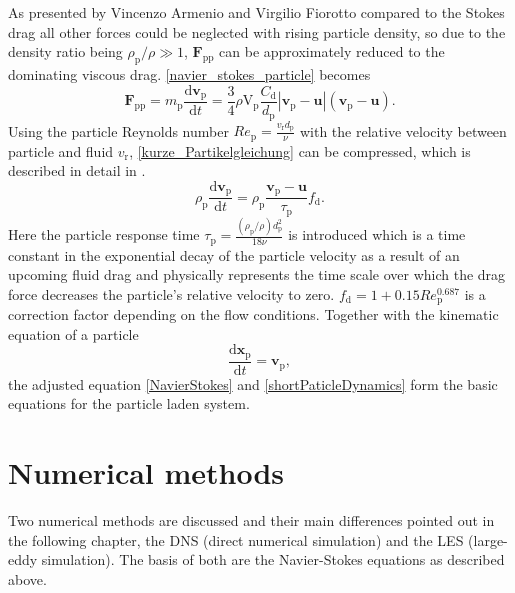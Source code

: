 \documentclass[11pt,a4paper,openany,oneside,parskip=half*]{article}
\renewcommand*\vec[1]{\boldsymbol{#1}}
\begin{document}
As presented by Vincenzo Armenio and Virgilio Fiorotto \cite{TheImportanceOfTheFocusActingOnParticlesInTurbulentFlows} compared to the Stokes drag all other forces could be neglected with rising particle density, so due to the density ratio being $\rho_\mathrm{p}/\rho \gg 1$, $\vec{F}_\mathrm{pp}$ can be approximately reduced to the dominating viscous drag. \eqref{navier_stokes_particle} becomes 
\begin{equation} \label{kurze_Partikelgleichung}
\vec{F}_\mathrm{pp} =  m_\mathrm{p} \frac{\mathrm{d}\vec{v}_\mathrm{p}}{\mathrm{d}t} = \frac{3}{4}\rho \mathrm{V}_\mathrm{p} \frac{C_\mathrm{d}}{d_\mathrm{p}}|\vec{v}_\mathrm{p}-\vec{u}|(\vec{v}_\mathrm{p}-\vec{u}).
\end{equation} 
Using the particle Reynolds number $Re_\mathrm{p} = \frac{v_\mathrm{r}d_\mathrm{p}}{\nu}$ with the relative velocity between particle and fluid $v_\mathrm{r}$,  \eqref{kurze_Partikelgleichung} can be compressed, which is described in detail in \cite{computationalMethodsforMultiphaseFlow}.
\begin{equation} \label{shortPaticleDynamics}
\rho_\mathrm{p}\frac{\mathrm{d}\vec{v}_\mathrm{p}}{\mathrm{d}t} = \rho_\mathrm{p}\frac{\vec{v}_\mathrm{p}-\vec{u}}{\tau_\mathrm{p}}f_\mathrm{d}.
\end{equation}
Here the particle response time $\tau_\mathrm{p} = \frac{(\rho_\mathrm{p}/\rho)d_\mathrm{p}^\mathrm{2}}{18\nu}$ is introduced which is a time constant in the exponential decay of the particle velocity as a result of an upcoming fluid drag and physically represents the time scale over which the drag force decreases the particle's relative velocity to zero.
$f_\mathrm{d} = 1+0.15Re_\mathrm{p}^\mathrm{0.687}$ is a correction factor depending on the flow conditions.
Together with the kinematic equation of a particle   
\begin{equation}
 \frac{\mathrm{d}\vec{x}_\mathrm{p}}{\mathrm{d}t} = \vec{v}_\mathrm{p},
\end{equation}
the adjusted equation \eqref{NavierStokes} and \eqref{shortPaticleDynamics} form the basic equations for the particle laden system. 
\pagebreak
\section{Numerical methods} %
Two numerical methods are discussed and their main differences pointed out in the following chapter, the DNS (direct numerical simulation) and the LES (large-eddy simulation). The basis of both are the Navier-Stokes equations as described above.
\newline
\end{document}
